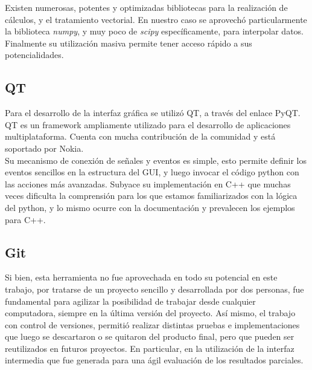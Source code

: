 Existen numerosas, potentes y optimizadas bibliotecas para la realizaci\'on de c\'alculos, y el tratamiento vectorial. En nuestro caso se aprovech\'o particularmente la biblioteca {\it{numpy}}, y muy poco de {\it{scipy}} espec\'ificamente, para interpolar datos.
Finalmente su utilizaci\'on masiva permite tener acceso r\'apido a sus potencialidades.\\

\subsection*{QT}
Para el desarrollo de la interfaz gr\'afica se utiliz\'o QT, a trav\'es del enlace PyQT.\\
QT es un framework ampliamente utilizado para el desarrollo de aplicaciones multiplataforma. Cuenta con mucha contribuci\'on de la comunidad y est\'a soportado por Nokia.\\

Su mecanismo de conexión de señales y eventos es simple, esto permite definir los eventos sencillos en la estructura del GUI, y luego invocar el c\'odigo python con las acciones m\'as avanzadas. Subyace su implementaci\'on en C++ que muchas veces dificulta la comprensi\'on para los que estamos familiarizados con la l\'ogica del python, y lo mismo ocurre con la documentaci\'on y prevalecen los ejemplos para C++.\\

\subsection*{Git}
Si bien, esta herramienta no fue aprovechada en todo su potencial en este trabajo, por tratarse de un proyecto sencillo y desarrollada por dos personas, fue fundamental para agilizar la posibilidad de trabajar desde cualquier computadora, siempre en la \'ultima versi\'on del proyecto.
As\'i mismo, el trabajo con control de versiones, permiti\'o realizar distintas pruebas e implementaciones que luego se descartaron o se quitaron del producto final, pero que pueden ser reutilizados en futuros proyectos. En particular, en la utilizaci\'on de la interfaz intermedia que fue generada para una \'agil evaluaci\'on de los resultados parciales.\\









